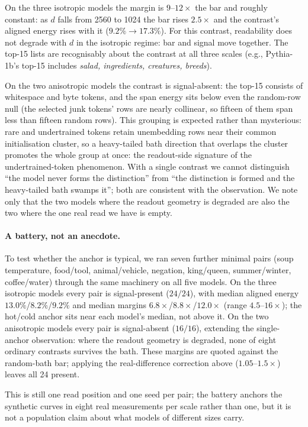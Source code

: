 \documentclass[11pt]{article}
\begin{document}
On the three isotropic models the margin is $9$--$12\times$ the bar
and roughly constant: as $d$ falls from 2560 to 1024 the bar rises
$2.5\times$ and the contrast's aligned energy rises with it
($9.2\% \to 17.3\%$). For this contrast, readability does not degrade
with $d$ in the isotropic regime: bar and signal move together.
The top-15 lists are recognisably about the contrast at all three
scales (e.g., Pythia-1b's top-15 includes \emph{salad, ingredients,
creatures, breeds}).

On the two anisotropic models the contrast is signal-absent: the
top-15 consists of whitespace and byte tokens, and the span energy
sits below even the random-row null (the selected junk tokens' rows
are nearly collinear, so fifteen of them span less than fifteen
random rows). This grouping is expected rather than mysterious: rare
and undertrained tokens retain unembedding rows near their common
initialisation cluster, so a heavy-tailed bath direction that overlaps
the cluster promotes the whole group at once: the readout-side
signature of the undertrained-token phenomenon. With a single contrast we cannot distinguish ``the
model never forms the distinction'' from ``the distinction is formed
and the heavy-tailed bath swamps it''; both are consistent with the
observation. We note only that the two models where the readout
geometry is degraded are also the two where the one real read we have
is empty.

\paragraph{A battery, not an anecdote.} To test whether the anchor is
typical, we ran seven further minimal pairs (soup temperature,
food/tool, animal/vehicle, negation, king/queen, summer/winter,
coffee/water) through the same machinery on all five models. On the
three isotropic models every pair is signal-present ($24/24$), with
median aligned energy $13.0\%$/$8.2\%$/$9.2\%$ and median margins
$6.8\times$/$8.8\times$/$12.0\times$ (range $4.5$--$16\times$);
the hot/cold anchor sits near each model's median, not above it. On
the two anisotropic models every pair is signal-absent ($16/16$),
extending the single-anchor observation: where the readout geometry
is degraded, none of eight ordinary contrasts survives the bath.
These margins are quoted against the random-bath bar; applying the
real-difference correction above ($1.05$--$1.5\times$) leaves all 24
present.

This is still one read position and one seed per pair; the battery
anchors the synthetic curves in eight real measurements per scale
rather than one, but it is not a population claim about what models
of different sizes carry.
\end{document}
